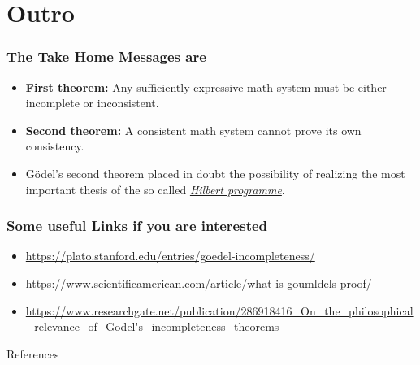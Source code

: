 \documentclass[aspectratio=169]{beamer}
\begin{document}
\section{Outro}
\begin{frame}
	\frametitle{The Take Home Messages are}
	\begin{itemize}
		\item \textbf{First theorem:} Any sufficiently expressive math system must be either incomplete or inconsistent.
		\item \textbf{Second theorem:} A consistent math system cannot prove its own consistency.
		\item Gödel's second theorem placed in doubt the possibility of realizing the most important thesis of the so called \href{https://en.wikipedia.org/wiki/Hilbert\%27s_problems}{\textit{Hilbert programme}}. \cite{bekl}
	\end{itemize}
	\begin{frame}
	\frametitle{Some useful Links if you are interested}
	\begin{itemize}
		\item \url{https://plato.stanford.edu/entries/goedel-incompleteness/}
		\item \url{https://www.scientificamerican.com/article/what-is-goumldels-proof/}
		\item \url{https://www.researchgate.net/publication/286918416_On_the_philosophical_relevance_of_Godel's_incompleteness_theorems}
	\end{itemize}
\end{frame}

\end{frame}
\begin{frame}{References}
    
    
\end{frame}
\end{document}
